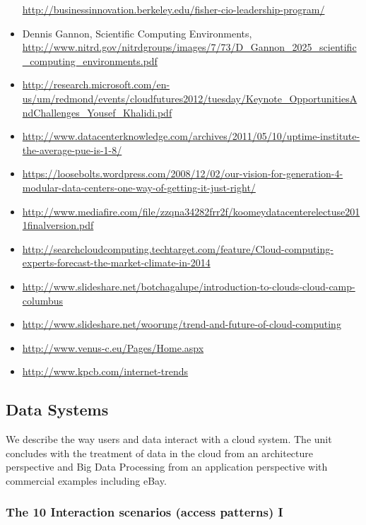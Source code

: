 \begin{itemize}
  \url{http://businessinnovation.berkeley.edu/fisher-cio-leadership-program/}
\item
  Dennis Gannon, Scientific Computing Environments,
  \url{http://www.nitrd.gov/nitrdgroups/images/7/73/D_Gannon_2025_scientific_computing_environments.pdf}
\item
  \url{http://research.microsoft.com/en-us/um/redmond/events/cloudfutures2012/tuesday/Keynote_OpportunitiesAndChallenges_Yousef_Khalidi.pdf}
\item
  \url{http://www.datacenterknowledge.com/archives/2011/05/10/uptime-institute-the-average-pue-is-1-8/}
\item
  \url{https://loosebolts.wordpress.com/2008/12/02/our-vision-for-generation-4-modular-data-centers-one-way-of-getting-it-just-right/}
\item
  \url{http://www.mediafire.com/file/zzqna34282frr2f/koomeydatacenterelectuse2011finalversion.pdf}
\item
  \url{http://searchcloudcomputing.techtarget.com/feature/Cloud-computing-experts-forecast-the-market-climate-in-2014}
\item
  \url{http://www.slideshare.net/botchagalupe/introduction-to-clouds-cloud-camp-columbus}
\item
  \url{http://www.slideshare.net/woorung/trend-and-future-of-cloud-computing}
\item
  \url{http://www.venus-c.eu/Pages/Home.aspx}
\item
  \url{http://www.kpcb.com/internet-trends}
\end{itemize}

\subsection{Data Systems}

We describe the way users and data interact with a cloud system. The
unit concludes with the treatment of data in the cloud from an
architecture perspective and Big Data Processing from an application
perspective with commercial examples including eBay.


\subsubsection{The 10 Interaction scenarios (access patterns)
I}\label{the-10-interaction-scenarios-access-patterns-i}

